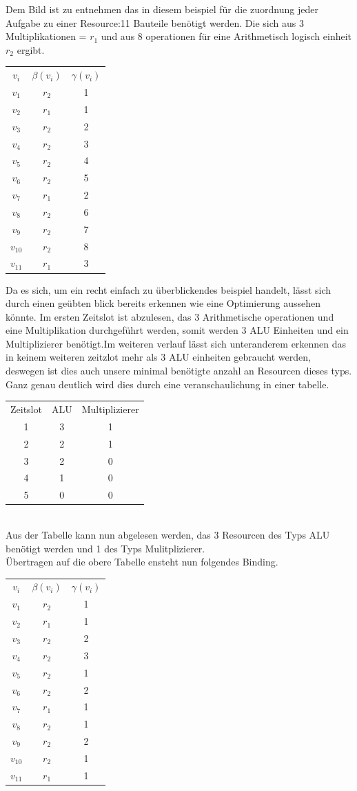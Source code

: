 \documentclass[conference]{IEEEtran}
\begin{document}
Dem Bild ist zu entnehmen das in diesem beispiel für die zuordnung jeder Aufgabe zu einer Resource:11 Bauteile benötigt werden.
 Die sich aus 3 Multiplikationen = $r_1$ und aus 8 operationen für eine Arithmetisch logisch einheit $r_2$ ergibt.\\
\begin{tabular}[h]{ccc}
$v_i$&$\beta(v_i)$&$\gamma(v_i)$\\
$v_1$&$r_2$&1\\
$v_2$&$r_1$&1\\
$v_3$&$r_2$&2\\
$v_4$&$r_2$&3\\
$v_5$&$r_2$&4\\
$v_6$&$r_2$&5\\
$v_7$&$r_1$&2\\
$v_8$&$r_2$&6\\
$v_9$&$r_2$&7\\
$v_10$&$r_2$&8\\
$v_11$&$r_1$&3\\
\end{tabular}
Da es sich, um ein recht einfach zu überblickendes beispiel handelt, lässt sich durch einen geübten blick bereits erkennen wie eine Optimierung aussehen könnte. Im ersten Zeitslot ist abzulesen, das 3 Arithmetische operationen und eine Multiplikation durchgeführt werden, somit werden 3 ALU Einheiten und ein Multiplizierer benötigt.Im weiteren verlauf lässt sich unteranderem erkennen das in keinem weiteren zeitzlot mehr als 3 ALU einheiten gebraucht werden, deswegen ist dies auch unsere minimal benötigte anzahl an Resourcen dieses typs. Ganz genau deutlich wird dies durch eine veranschaulichung in einer tabelle.
\begin{tabular}[h]{ccc}
Zeitslot&ALU&Multiplizierer\\
1&3&1\\
2&2&1\\
3&2&0\\
4&1&0\\
5&0&0\\
\end{tabular}
\\Aus der Tabelle kann nun abgelesen werden, das 3 Resourcen des Typs ALU benötigt werden und 1 des Typs Mulitplizierer.\\
Übertragen auf die obere Tabelle ensteht nun folgendes Binding.\\
\begin{tabular}[h]{ccc}
$v_i$&$\beta(v_i)$&$\gamma(v_i)$\\
$v_1$&$r_2$&1\\
$v_2$&$r_1$&1\\
$v_3$&$r_2$&2\\
$v_4$&$r_2$&3\\
$v_5$&$r_2$&1\\
$v_6$&$r_2$&2\\
$v_7$&$r_1$&1\\
$v_8$&$r_2$&1\\
$v_9$&$r_2$&2\\
$v_10$&$r_2$&1\\
$v_11$&$r_1$&1\\
\end{tabular}
\end{document}
